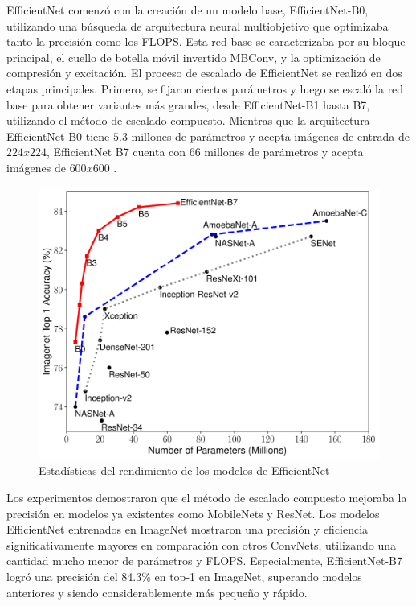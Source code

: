 EfficientNet comenzó con la creación de un modelo base, EfficientNet-B0, utilizando una búsqueda de arquitectura neural multiobjetivo que optimizaba tanto la precisión como los FLOPS. Esta red base se caracterizaba por su bloque principal, el cuello de botella móvil invertido MBConv, y la optimización de compresión y excitación. El proceso de escalado de EfficientNet se realizó en dos etapas principales. Primero, se fijaron ciertos parámetros y luego se escaló la red base para obtener variantes más grandes, desde EfficientNet-B1 hasta B7, utilizando el método de escalado compuesto. Mientras que la arquitectura EfficientNet B0 tiene $5.3$ millones de parámetros y acepta imágenes de entrada de $224x224$, EfficientNet B7 cuenta con $66$ millones de parámetros y acepta imágenes de $600x600$ .
  
   \begin{figure}[ht]%
      \begin{center}
      \includegraphics[width=1\textwidth]{./Graphics/efficientnet_performance.png}
      \caption{Estadísticas del rendimiento de los modelos de EfficientNet}
      \label{fig:efficientnet_performance}
      \end{center}
      \end{figure}

Los experimentos demostraron que el método de escalado compuesto mejoraba la precisión en modelos ya existentes como MobileNets y ResNet. Los modelos EfficientNet entrenados en ImageNet mostraron una precisión y eficiencia significativamente mayores en comparación con otros ConvNets, utilizando una cantidad mucho menor de parámetros y FLOPS. Especialmente, EfficientNet-B7 logró una precisión del 84.3\% en top-1 en ImageNet, superando modelos anteriores y siendo considerablemente más pequeño y rápido.

